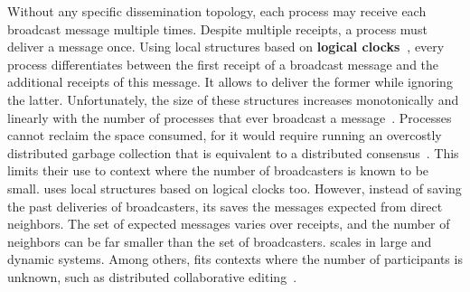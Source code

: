 Without any specific dissemination topology, each process may receive each
broadcast message multiple times. Despite multiple receipts, a process must
deliver a message once.
Using local structures based on \textbf{logical clocks~\cite{lamport1978time}},
every process differentiates between the first receipt of a broadcast message
and the additional receipts of this message. It allows to deliver the former
while ignoring the latter. Unfortunately, the size of these structures increases
monotonically and linearly with the number of processes that ever broadcast a
message~\cite{malkhi2007concise,mukund2014optimized}.  Processes cannot reclaim
the space consumed, for it would require running an overcostly distributed
garbage collection that is equivalent to a distributed
consensus~\cite{abdullahi1998garbage}.  This limits their use to context where
the number of broadcasters is known to be small.  \RPCBROADCAST uses local
structures based on logical clocks too. However, instead of saving the past
deliveries of broadcasters, its saves the messages expected from direct
neighbors. The set of expected messages varies over receipts, and the number of
neighbors can be far smaller than the set of broadcasters. \RPCBROADCAST scales
in large and dynamic systems. Among others, \RPCBROADCAST fits contexts where
the number of participants is unknown, such as distributed collaborative
editing~\cite{nedelec2016crate}.


